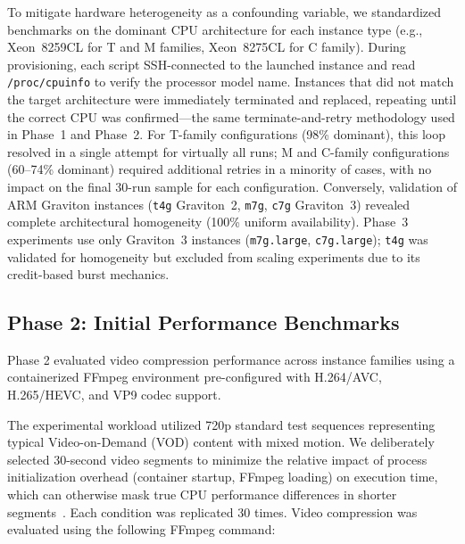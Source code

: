 \documentclass[conference]{IEEEtran}
\begin{document}
To mitigate hardware heterogeneity as a confounding variable, we standardized
benchmarks on the dominant CPU architecture for each instance type
(e.g., Xeon~8259CL for T and M families, Xeon~8275CL for C family).
During provisioning, each script SSH-connected to the launched instance and
read \texttt{/proc/cpuinfo} to verify the processor model name. Instances
that did not match the target architecture were immediately terminated and
replaced, repeating until the correct CPU was confirmed---the same
terminate-and-retry methodology used in Phase~1 and Phase~2. For T-family
configurations (98\% dominant), this loop resolved in a single attempt for
virtually all runs; M and C-family configurations (60--74\% dominant)
required additional retries in a minority of cases, with no impact on the
final 30-run sample for each configuration. Conversely, validation of ARM Graviton instances (\texttt{t4g} Graviton~2, \texttt{m7g}, \texttt{c7g} Graviton~3) revealed complete architectural homogeneity (100\% uniform availability). Phase~3 experiments use only Graviton~3 instances (\texttt{m7g.large}, \texttt{c7g.large}); \texttt{t4g} was validated for homogeneity but excluded from scaling experiments due to its credit-based burst mechanics.

\subsection{Phase 2: Initial Performance Benchmarks}

Phase 2 evaluated video compression performance across instance families using
a containerized FFmpeg environment pre-configured with H.264/AVC, H.265/HEVC,
and VP9 codec support.

The experimental workload utilized 720p standard test sequences representing
typical Video-on-Demand (VOD) content with mixed motion. We deliberately
selected 30-second video segments to minimize the relative impact of process
initialization overhead (container startup, FFmpeg loading) on execution time,
which can otherwise mask true CPU performance differences in shorter segments~\cite{dockercoldstart}.
Each condition was replicated 30 times. Video compression was evaluated using
the following FFmpeg command:

\begin{center}
	{\ttfamily\scriptsize
	}
\end{center}
\end{document}
